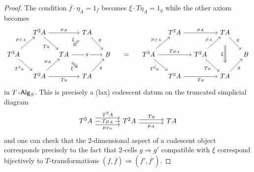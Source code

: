 \documentclass[a4paper,11pt,oneside,openany]{scrbook}
\begin{document}
\begin{proof}
    The condition $\overline{f}\cdot\eta_A=1_f$ becomes $\xi\cdot T\eta_A=1_g$
    while the other axiom becomes
    \[\begin{tikzcd}[column sep=small]
        & {T^2A} &&  TA &&&& {T^2A} && TA \\
        {T^3A} && TA && B & {=} & {T^3A} && {T^2A} && B \\
        & {T^2A} && TA &&&& {T^2A} && TA
        \arrow["Ta"', from=1-2, to=2-3]
        \arrow[""{name=0, anchor=center, inner sep=0}, "{\mu_A}", from=1-2, to=1-4]
        \arrow["g", from=1-4, to=2-5]
        \arrow["g"{description}, from=2-3, to=2-5]
        \arrow["g"', from=3-4, to=2-5]
        \arrow["Ta"', from=3-2, to=3-4]
        \arrow["{\mu_A}", from=3-2, to=2-3]
        \arrow["{T^2a}"', from=2-1, to=3-2]
        \arrow["{\mu_{TA}}", from=2-1, to=1-2]
        \arrow["\xi"', shorten <=8pt, shorten >=8pt, Rightarrow, from=1-4, to=2-3]
        \arrow["\xi"', shorten <=8pt, shorten >=8pt, Rightarrow, from=2-3, to=3-4]
        \arrow["g", from=1-10, to=2-11]
        \arrow["g"', from=3-10, to=2-11]
        \arrow["Ta"', from=2-9, to=3-10]
        \arrow["{\mu_A}", from=2-9, to=1-10]
        \arrow["\xi"', shorten <=13pt, shorten >=13pt, Rightarrow, from=1-10, to=3-10]
        \arrow["{\mu_A}", from=1-8, to=1-10]
        \arrow["{\mu_{TA}}", from=2-7, to=1-8]
        \arrow["{T^2a}"', from=2-7, to=3-8]
        \arrow["Ta"', from=3-8, to=3-10]
        \arrow["{T\mu_A}", from=2-7, to=2-9]
    \end{tikzcd}\]
    in $T\operatorname{-\mathsf{Alg}}_S$. This is precisely a (lax) codescent datum on the truncated
    simplicial diagram
    \[\begin{tikzcd}[column sep=large]
        {T^3A} & {T^2A} & TA
        \arrow["Ta", shift left=1, from=1-2, to=1-3]
        \arrow["{\mu_A}"', shift right=1, from=1-2, to=1-3]
        \arrow["{T\mu_A}"{description}, from=1-1, to=1-2]
        \arrow["{T^2A}", shift left=2, from=1-1, to=1-2]
        \arrow["{\mu_{Ta}}"', shift right=2, from=1-1, to=1-2]
    \end{tikzcd}\]
    and one can check that the 2-dimensional aspect of a codescent object
    corresponds precisely to the fact that 2-cells $g\Rightarrow g'$ compatible
    with $\xi$ correspond bijectively to $T$-transformations
    $(f,\overline{f})\Rightarrow(f',\overline{f'})$.
\end{proof}

\backmatter
\end{document}
